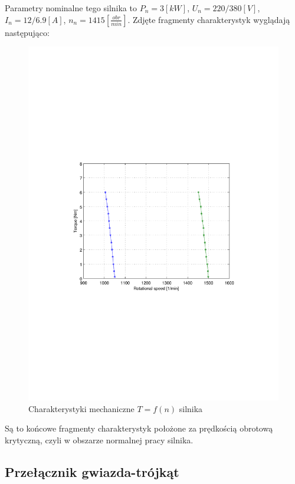\documentclass[12pt]{article}
\begin{document}
Parametry nominalne tego silnika to $P_n=3[kW]$, $U_n=220/380[V]$,
$I_n=12/6.9[A]$, $n_n=1415[\frac{obr}{min}]$.
Zdjęte fragmenty charakterystyk wyglądają następująco:

\begin{figure}[!htb]
	\begin{center}
		\includegraphics[trim=5cm 9cm 5cm 9cm]{../res/img/T_f(n)2.pdf} 
	\end{center}
	\caption{Charakterystyki mechaniczne $T=f(n)$ silnika}
\end{figure}

Są to końcowe fragmenty charakterystyk położone za prędkością obrotową
krytyczną, czyli w obszarze normalnej pracy silnika.

\newpage

\subsection{Przełącznik gwiazda-trójkąt}
\end{document}
